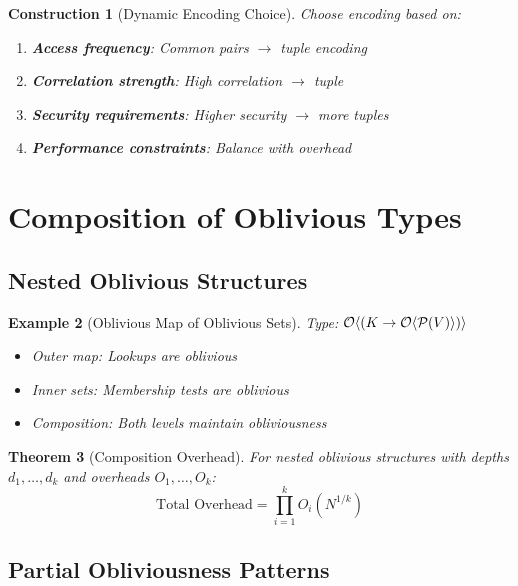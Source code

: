 \documentclass[11pt,final]{article}
\newtheorem{theorem}{Theorem}[section]
\newtheorem{example}[theorem]{Example}
\newtheorem{construction}[theorem]{Construction}
\begin{document}
\begin{construction}[Dynamic Encoding Choice]
Choose encoding based on:
\begin{enumerate}
    \item \textbf{Access frequency}: Common pairs $\to$ tuple encoding
    \item \textbf{Correlation strength}: High correlation $\to$ tuple
    \item \textbf{Security requirements}: Higher security $\to$ more tuples
    \item \textbf{Performance constraints}: Balance with overhead
\end{enumerate}
\end{construction}

\section{Composition of Oblivious Types}

\subsection{Nested Oblivious Structures}

\begin{example}[Oblivious Map of Oblivious Sets]
Type: $\mathcal{O}\langle (K \to \mathcal{O}\langle \mathcal{P}(V) \rangle) \rangle$
\begin{itemize}
    \item Outer map: Lookups are oblivious
    \item Inner sets: Membership tests are oblivious
    \item Composition: Both levels maintain obliviousness
\end{itemize}
\end{example}

\begin{theorem}[Composition Overhead]
For nested oblivious structures with depths $d_1, \ldots, d_k$ and overheads $O_1, \ldots, O_k$:
\begin{equation}
\text{Total Overhead} = \prod_{i=1}^k O_i(N^{1/k})
\end{equation}
\end{theorem}

\subsection{Partial Obliviousness Patterns}
\end{document}
